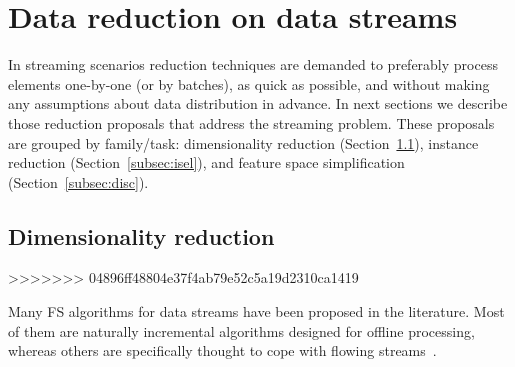\documentclass[preprint,12pt]{elsarticle}
\begin{document}
\section{Data reduction on data streams}
\label{sec:redstream}

In streaming scenarios reduction techniques are demanded to preferably process elements one-by-one (or by batches), as quick as possible, and without making any assumptions about data distribution in advance. In next sections we describe those reduction proposals that address the streaming problem. These proposals are grouped by family/task: dimensionality reduction (Section~\ref{subsec:dimred}), instance reduction (Section~\ref{subsec:isel}), and feature space simplification (Section~\ref{subsec:disc}).


\subsection{Dimensionality reduction}
\label{subsec:dimred}
>>>>>>> 04896ff48804e37f4ab79e52c5a19d2310ca1419

Many FS algorithms for data streams have been proposed in the literature. Most of them are naturally incremental algorithms designed for offline processing, whereas others are specifically thought to cope with flowing streams~\cite{bolon15}. 
\end{document}
